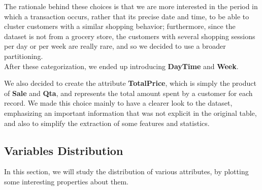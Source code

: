 The rationale behind these choices is that we are more interested in the period in which a transaction occurs, rather that its precise date and time, to be able to cluster customers with a similar shopping behavior; furthermore, since the dataset is not from a grocery store, the customers with several shopping sessions per day or per week are really rare, and so we decided to use a broader partitioning.\\
After these categorization, we ended up introducing \textbf{DayTime} and \textbf{Week}.

We also decided to create the attribute \textbf{TotalPrice}, which is simply the product of \textbf{Sale} and \textbf{Qta}, and represents the total amount spent by a customer for each record. We made this choice mainly to have a clearer look to the dataset, emphasizing an important information that was not explicit in the original table, and also to simplify the extraction of some features and statistics.

\subsection{Variables Distribution}
In this section, we will study the distribution of various attributes, by plotting some interesting properties about them.

